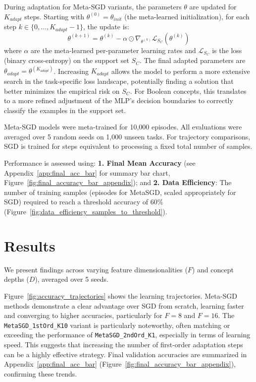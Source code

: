\documentclass{article}
\begin{document}
During adaptation for Meta-SGD variants, the parameters $\theta$ are updated for $K_{adapt}$ steps. Starting with $\theta^{(0)} = \theta_{init}$ (the meta-learned initialization), for each step $k \in \{0, \dots, K_{adapt}-1\}$, the update is:
\[
\theta^{(k+1)} = \theta^{(k)} - \alpha \odot \nabla_{\theta^{(k)}} \mathcal{L}_{S_C}(\theta^{(k)}) \label{eq:adapt_step}
\]
where $\alpha$ are the meta-learned per-parameter learning rates and $\mathcal{L}_{S_C}$ is the loss (binary cross-entropy) on the support set $S_C$. The final adapted parameters are $\theta_{adapt} = \theta^{(K_{adapt})}$. Increasing $K_{adapt}$ allows the model to perform a more extensive search in the task-specific loss landscape, potentially finding a solution that better minimizes the empirical risk on $S_C$. For Boolean concepts, this translates to a more refined adjustment of the MLP's decision boundaries to correctly classify the examples in the support set.

Meta-SGD models were meta-trained for 10,000 episodes. All evaluations were averaged over 5 random seeds on 1,000 unseen tasks. For trajectory comparisons, SGD is trained for steps equivalent to processing a fixed total number of samples.

Performance is assessed using: \textbf{1. Final Mean Accuracy} (see Appendix~\ref{app:final_acc_bar} for summary bar chart, Figure~\ref{fig:final_accuracy_bar_appendix}); and \textbf{2. Data Efficiency}: The number of training samples (episodes for MetaSGD, scaled appropriately for SGD) required to reach a threshold accuracy of 60\% (Figure~\ref{fig:data_efficiency_samples_to_threshold}).

\section{Results}\label{sec:results}
We present findings across varying feature dimensionalities ($F$) and concept depths ($D$), averaged over 5 seeds.

Figure~\ref{fig:accuracy_trajectories} shows the learning trajectories. Meta-SGD methods demonstrate a clear advantage over SGD from scratch, learning faster and converging to higher accuracies, particularly for $F=8$ and $F=16$. The \texttt{MetaSGD\_1stOrd\_K10} variant is particularly noteworthy, often matching or exceeding the performance of \texttt{MetaSGD\_2ndOrd\_K1}, especially in terms of learning speed. This suggests that increasing the number of first-order adaptation steps can be a highly effective strategy. Final validation accuracies are summarized in Appendix~\ref{app:final_acc_bar} (Figure~\ref{fig:final_accuracy_bar_appendix}), confirming these trends.
\end{document}
